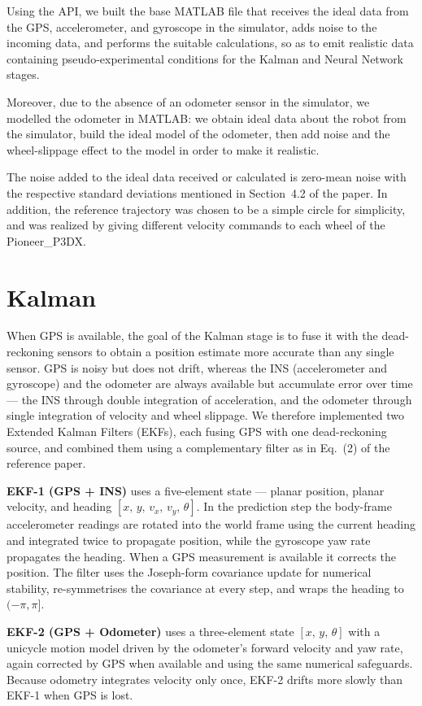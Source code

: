 \documentclass[11pt,a4paper]{article}
\begin{document}
Using the API, we built the base MATLAB file that receives the ideal data from the
GPS, accelerometer, and gyroscope in the simulator, adds noise to the incoming data,
and performs the suitable calculations, so as to emit realistic data containing
pseudo-experimental conditions for the Kalman and Neural Network stages.

Moreover, due to the absence of an odometer sensor in the simulator, we modelled the
odometer in MATLAB: we obtain ideal data about the robot from the simulator, build
the ideal model of the odometer, then add noise and the wheel-slippage effect to the
model in order to make it realistic.

The noise added to the ideal data received or calculated is zero-mean noise with the
respective standard deviations mentioned in Section~4.2 of the paper. In addition,
the reference trajectory was chosen to be a simple circle for simplicity, and was
realized by giving different velocity commands to each wheel of the Pioneer\_P3DX.


\section{Kalman}

When GPS is available, the goal of the Kalman stage is to fuse it with the
dead-reckoning sensors to obtain a position estimate more accurate than any single
sensor. GPS is noisy but does not drift, whereas the INS (accelerometer and
gyroscope) and the odometer are always available but accumulate error over time ---
the INS through double integration of acceleration, and the odometer through single
integration of velocity and wheel slippage. We therefore implemented two Extended
Kalman Filters (EKFs), each fusing GPS with one dead-reckoning source, and combined
them using a complementary filter as in Eq.~(2) of the reference paper.

\textbf{EKF-1 (GPS + INS)} uses a five-element state --- planar position, planar
velocity, and heading $[x,\,y,\,v_x,\,v_y,\,\theta]$. In the prediction step the
body-frame accelerometer readings are rotated into the world frame using the current
heading and integrated twice to propagate position, while the gyroscope yaw rate
propagates the heading. When a GPS measurement is available it corrects the position.
The filter uses the Joseph-form covariance update for numerical stability,
re-symmetrises the covariance at every step, and wraps the heading to $(-\pi,\pi]$.

\textbf{EKF-2 (GPS + Odometer)} uses a three-element state $[x,\,y,\,\theta]$ with a
unicycle motion model driven by the odometer's forward velocity and yaw rate, again
corrected by GPS when available and using the same numerical safeguards. Because
odometry integrates velocity only once, EKF-2 drifts more slowly than EKF-1 when GPS
is lost.
\end{document}
